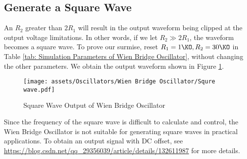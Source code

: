 \documentclass[D:/a_RemoteRepo/GH.LatexNotes/.demo/Analog_Circuits_Handbook.tex]{subfiles}
\begin{document}
\subsection{Generate a Square Wave}
An $R_2$ greater than $2 R_1$ will result in the output waveform being clipped at the output voltage limitations. In other words, if we let $R_2 \gg 2R_1$, the waveform becomes a square wave. To prove our surmise, reset $R_1 = 1 \KO, R_2 = 30 \KO$ in Table \ref{tab: Simulation Parameters of Wien Bridge Oscillator}, without changing the other parameters. We obtain the output waveform shown in Figure \ref{fig: Square Wave Output of Wien Bridge Oscillator}.

\begin{figure}[H]\centering
    \texttt{[image: assets/Oscillators/Wien Bridge Oscillator/Squre wave.pdf]}
    \caption{Square Wave Output of Wien Bridge Oscillator}
    \label{fig: Square Wave Output of Wien Bridge Oscillator}
\end{figure}

Since the frequency of the square wave is difficult to calculate and control, the Wien Bridge Oscillator is not suitable for generating square waves in practical applications. To obtain an output signal with DC offset, see \url{https://blog.csdn.net/qq_29356039/article/details/132611987} for more details.





\end{document}
